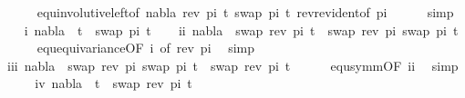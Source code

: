 \begin{isabellebody}
\ \ \ \ \isamarkupfalse%
\ equ{\isacharunderscore}{\kern0pt}involutive{\isacharunderscore}{\kern0pt}left{\isacharbrackleft}{\kern0pt}of\ nabla\ {\isacartoucheopen}rev\ pi{\isacartoucheclose}\ t{}\ {\isacartoucheopen}swap\ pi\ t{}{\isacartoucheclose}{\isacharbrackright}{\kern0pt}\ rev{\isacharunderscore}{\kern0pt}rev{\isacharunderscore}{\kern0pt}ident{\isacharbrackleft}{\kern0pt}of\ pi{\isacharbrackright}{\kern0pt}\isanewline
\ \ \ \ \isamarkupfalse%
\ simp\isacommand{{\isacharbraceright}{\kern0pt}}\isamarkupfalse%
\isanewline
\isanewline
\ \ \isacommand{{\isacharbraceleft}{\kern0pt}}\isamarkupfalse%
\isamarkupfalse%
\ i{\isacharcolon}{\kern0pt}\ {\isachardoublequoteopen}nabla\ {\isasymturnstile}\ t{}\ {\isasymapprox}\ swap\ pi\ t{}{\isachardoublequoteclose}\isanewline
\ \ \isamarkupfalse%
\ ii{\isacharcolon}{\kern0pt}\ {\isachardoublequoteopen}nabla\ {\isasymturnstile}\ swap\ {\isacharparenleft}{\kern0pt}rev\ pi{\isacharparenright}{\kern0pt}\ t{}\ {\isasymapprox}\ swap\ {\isacharparenleft}{\kern0pt}rev\ pi{\isacharparenright}{\kern0pt}\ {\isacharparenleft}{\kern0pt}swap\ pi\ t{}{\isacharparenright}{\kern0pt}{\isachardoublequoteclose}\isanewline
\ \ \ \ \isamarkupfalse%
\ equ{\isacharunderscore}{\kern0pt}equivariance{\isacharbrackleft}{\kern0pt}OF\ i{\isacharcomma}{\kern0pt}\ of\ {\isacartoucheopen}rev\ pi{\isacartoucheclose}{\isacharbrackright}{\kern0pt}\ \isamarkupfalse%
\ simp\isanewline
\ \ \isamarkupfalse%
\ \isamarkupfalse%
\ iii{\isacharcolon}{\kern0pt}\ {\isachardoublequoteopen}nabla\ {\isasymturnstile}\ swap\ {\isacharparenleft}{\kern0pt}rev\ pi{\isacharparenright}{\kern0pt}\ {\isacharparenleft}{\kern0pt}swap\ pi\ t{}{\isacharparenright}{\kern0pt}\ {\isasymapprox}\ swap\ {\isacharparenleft}{\kern0pt}rev\ pi{\isacharparenright}{\kern0pt}\ t{}{\isachardoublequoteclose}\isanewline
\ \ \ \ \isamarkupfalse%
\ equ{\isacharunderscore}{\kern0pt}symm{\isacharbrackleft}{\kern0pt}OF\ ii{\isacharbrackright}{\kern0pt}\ \isamarkupfalse%
\ simp\isanewline
\ \ \isamarkupfalse%
\ \isamarkupfalse%
\ iv{\isacharcolon}{\kern0pt}\ {\isachardoublequoteopen}nabla\ {\isasymturnstile}\ t{}\ {\isasymapprox}\ swap\ {\isacharparenleft}{\kern0pt}rev\ pi{\isacharparenright}{\kern0pt}\ t{}{\isachardoublequoteclose}\isanewline
\ \ \ \ \isamarkupfalse%

\end{isabellebody}
